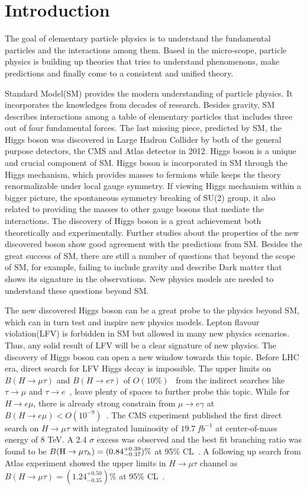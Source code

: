
\chapter{Introduction}

The goal of elementary particle physics is to understand the fundamental particles and the interactions among them. Based in the micro-scope, particle physics is building up theories that tries to understand phenomenons, make predictions and finally come to a consistent and unified theory. 

Standard Model(SM) provides the modern understanding of particle physics. It incorporates the knowledges from decades of research. Besides gravity, SM describes interactions among a table of elementary particles that includes three out of four fundamental forces. The last missing piece, predicted by SM, the Higgs boson was discovered in Large Hadron Collider by both of the general purpose detectors, the CMS and Atlas detector in 2012. Higgs boson is a unique and crucial component of SM. Higgs boson is incorporated in SM through the Higgs mechanism, which provides masses to fermions while keeps the theory renormalizable under local gauge symmetry. If viewing Higgs mechanism within a bigger picture, the spontaneous symmetry breaking of SU(2) group, it also related to providing the masses to other gauge bosons that mediate the interactions. The discovery of Higgs boson is a great achievement both theoretically and experimentally. Further studies about the properties of the new discovered boson show good agreement with the predictions from SM. Besides the great success of SM, there are still a number of questions that beyond the scope of SM, for example, failing to include gravity and describe Dark matter that shows its signature in the observations. New physics models are needed to understand these questions beyond SM.  

The new discovered Higgs boson can be a great probe to the physics beyond SM, which can in turn test and inspire new physics models. Lepton flavour violation(LFV) is forbidden in SM but allowed in many new physics scenarios. Thus, any solid result of LFV will be a clear signature of new physics. The discovery of Higgs boson can open a new window towards this topic. Before LHC era, direct search for LFV Higgs decay is impossible. The upper limits on $B(H \to \mu \tau)$ and $B(H \to e \tau)$ of $O(10\%)$~\cite{Blankenburg:2012ex,Harnik2012pb} from the indirect searches like $\tau \to \mu$ and $\tau \to e$~\cite{Celis:2013xja}, leave plenty of spaces to further probe this topic. While for $H \to e\mu$, there is already strong constrain from $\mu \to e\gamma$ at $B(H\to e \mu)<O(10^{-9})$~\cite{TheMEG2016wtm}. The CMS experiment published the first direct search on $H \to \mu \tau$ with integrated luminosity of $19.7~ fb^{-1}$ at center-of-mass energy of 8 TeV. A 2.4 $\sigma$ excess was observed and the best fit branching ratio was found to be $B(\mathrm{H}\to \mu\tau_{h})=(0.84^{+0.39}_{-0.37})\%$ at 95\% CL~\cite{2015337}. A following up search from Atlas experiment showed the upper limits in $H \to \mu \tau$ channel as $B(H \to \mu \tau)=(1.24^{+0.50}_{-0.35})\%$ at 95\% CL~\cite{Aad2015gha}.
  

